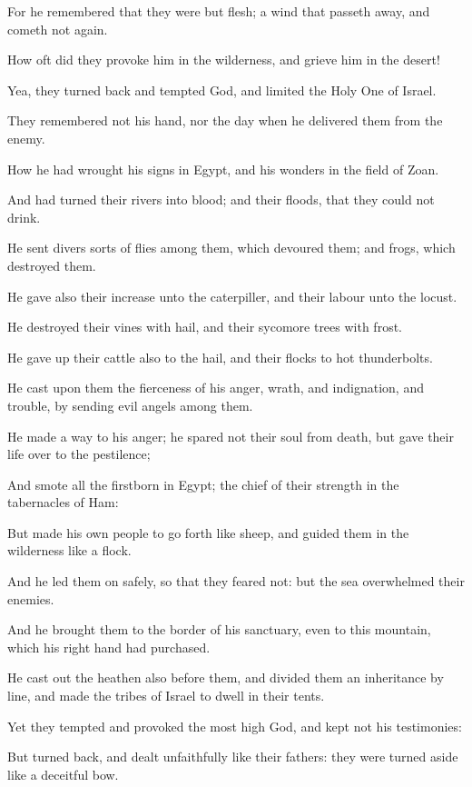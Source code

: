 \Verse For he remembered that they were but flesh; a wind that passeth away, and cometh not again.

\Verse How oft did they provoke him in the wilderness, and grieve him in the desert!

\Verse Yea, they turned back and tempted God, and limited the Holy One of Israel.

\Verse They remembered not his hand, nor the day when he delivered them from the enemy.

\Verse How he had wrought his signs in Egypt, and his wonders in the field of Zoan.

\Verse And had turned their rivers into blood; and their floods, that they could not drink.

\Verse He sent divers sorts of flies among them, which devoured them; and frogs, which destroyed them.

\Verse He gave also their increase unto the caterpiller, and their labour unto the locust.

\Verse He destroyed their vines with hail, and their sycomore trees with frost.

\Verse He gave up their cattle also to the hail, and their flocks to hot thunderbolts.

\Verse He cast upon them the fierceness of his anger, wrath, and indignation, and trouble, by sending evil angels among them.

\Verse He made a way to his anger; he spared not their soul from death, but gave their life over to the pestilence;

\Verse And smote all the firstborn in Egypt; the chief of their strength in the tabernacles of Ham:

\Verse But made his own people to go forth like sheep, and guided them in the wilderness like a flock.

\Verse And he led them on safely, so that they feared not: but the sea overwhelmed their enemies.

\Verse And he brought them to the border of his sanctuary, even to this mountain, which his right hand had purchased.

\Verse He cast out the heathen also before them, and divided them an inheritance by line, and made the tribes of Israel to dwell in their tents.

\Verse Yet they tempted and provoked the most high God, and kept not his testimonies:

\Verse But turned back, and dealt unfaithfully like their fathers: they were turned aside like a deceitful bow.

